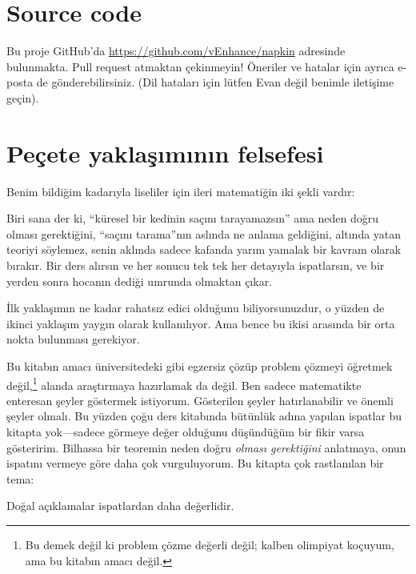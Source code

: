 \section*{Source code}
Bu proje GitHub'da
\url{https://github.com/vEnhance/napkin} adresinde bulunmakta.
Pull request atmaktan çekinmeyin! 
Öneriler ve hatalar için ayrıca e-posta de gönderebilirsiniz.
(Dil hataları için lütfen Evan değil benimle iletişime geçin).

\section*{Peçete yaklaşımının felsefesi}
Benim bildiğim kadarıyla liseliler için ileri matematiğin iki
şekli vardır:
\begin{itemize}
    \ii Biri sana der ki, ``küresel bir kedinin saçını tarayamazsın'' 
        ama neden doğru olması gerektiğini, ``saçını tarama''nın aslında 
        ne anlama geldiğini, altında yatan teoriyi söylemez, senin aklında 
        sadece kafanda yarım yamalak bir kavram olarak bırakır.
    \ii Bir ders alırsın ve her sonucu tek tek her detayıyla ispatlarsın, 
        ve bir yerden sonra hocanın dediği umrunda olmaktan çıkar.
\end{itemize}

İlk yaklaşımın ne kadar rahatsız edici olduğunu biliyorsunuzdur, o yüzden 
de ikinci yaklaşım yaygın olarak kullanılıyor. Ama bence bu ikisi arasında bir orta
nokta bulunması gerekiyor.


Bu kitabın amacı üniversitedeki gibi egzersiz çözüp problem çözmeyi 
öğretmek değil,\footnote{Bu demek değil ki problem çözme 
    değerli değil; kalben olimpiyat koçuyum, 
    ama bu kitabın amacı değil.}
alanda araştırmaya hazırlamak da değil. Ben sadece 
matematikte enteresan şeyler göstermek istiyorum. 
Gösterilen şeyler hatırlanabilir ve önemli şeyler 
olmalı. 
Bu yüzden çoğu ders kitabında bütünlük adına 
yapılan ispatlar bu kitapta yok---sadece görmeye değer 
olduğunu düşündüğüm bir fikir varsa gösteririm. 
Bilhassa bir teoremin neden doğru \emph{olması gerektiğini}
anlatmaya, onun ispatını vermeye göre daha çok vurguluyorum.
Bu kitapta çok rastlanılan bir tema:
\begin{moral}
    Doğal açıklamalar ispatlardan daha değerlidir.
\end{moral}

